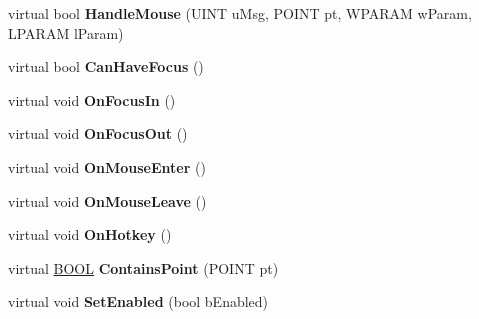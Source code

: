 \begin{DoxyCompactItemize}
\item 
\hypertarget{class_c_d_x_u_t_control_a263979b3221cb7a44b4caea72366c335}{virtual bool {\bfseries Handle\+Mouse} (U\+I\+N\+T u\+Msg, P\+O\+I\+N\+T pt, W\+P\+A\+R\+A\+M w\+Param, L\+P\+A\+R\+A\+M l\+Param)}\label{class_c_d_x_u_t_control_a263979b3221cb7a44b4caea72366c335}

\item 
\hypertarget{class_c_d_x_u_t_control_a5b2c6c474236a79b257c86caded9c0b7}{virtual bool {\bfseries Can\+Have\+Focus} ()}\label{class_c_d_x_u_t_control_a5b2c6c474236a79b257c86caded9c0b7}

\item 
\hypertarget{class_c_d_x_u_t_control_ab363eb5e296ddfc577f81bcd7667fd9b}{virtual void {\bfseries On\+Focus\+In} ()}\label{class_c_d_x_u_t_control_ab363eb5e296ddfc577f81bcd7667fd9b}

\item 
\hypertarget{class_c_d_x_u_t_control_afd5667a4ba9349e98db8c27a1b1d280d}{virtual void {\bfseries On\+Focus\+Out} ()}\label{class_c_d_x_u_t_control_afd5667a4ba9349e98db8c27a1b1d280d}

\item 
\hypertarget{class_c_d_x_u_t_control_a0bb610c517415f885989136bd7797229}{virtual void {\bfseries On\+Mouse\+Enter} ()}\label{class_c_d_x_u_t_control_a0bb610c517415f885989136bd7797229}

\item 
\hypertarget{class_c_d_x_u_t_control_ad641d612cbdeb58ab6fcadff807206d1}{virtual void {\bfseries On\+Mouse\+Leave} ()}\label{class_c_d_x_u_t_control_ad641d612cbdeb58ab6fcadff807206d1}

\item 
\hypertarget{class_c_d_x_u_t_control_a493169ad5b2877d6353eea95b697208e}{virtual void {\bfseries On\+Hotkey} ()}\label{class_c_d_x_u_t_control_a493169ad5b2877d6353eea95b697208e}

\item 
\hypertarget{class_c_d_x_u_t_control_a9b4410bbd1cac9a0ffce760aaa9a2d48}{virtual \hyperlink{_ice_types_8h_a050c65e107f0c828f856a231f4b4e788}{B\+O\+O\+L} {\bfseries Contains\+Point} (P\+O\+I\+N\+T pt)}\label{class_c_d_x_u_t_control_a9b4410bbd1cac9a0ffce760aaa9a2d48}

\item 
\hypertarget{class_c_d_x_u_t_control_afd0951616c5e521a12746df0637364f7}{virtual void {\bfseries Set\+Enabled} (bool b\+Enabled)}\label{class_c_d_x_u_t_control_afd0951616c5e521a12746df0637364f7}


\end{DoxyCompactItemize}
